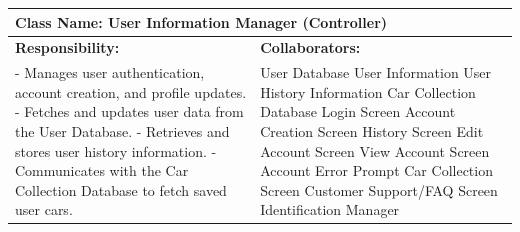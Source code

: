 \documentclass[]{article}
\begin{document}
\begin{table}[ht]
    \centering
    \begin{tabular}{|p{7cm}|p{7cm}|}
    \hline
     \multicolumn{2}{|l|}{\textbf{Class Name: User Information Manager (Controller)}} \\
    \hline
    \textbf{Responsibility:} & \textbf{Collaborators:} \\
    \hline
    - Manages user authentication, account creation, and profile updates. \newline
    - Fetches and updates user data from the User Database. \newline
    - Retrieves and stores user history information. \newline
    - Communicates with the Car Collection Database to fetch saved user cars.
    &
    User Database \newline
    User Information \newline
    User History Information \newline
    Car Collection Database \newline
    Login Screen \newline
    Account Creation Screen \newline
    History Screen \newline
    Edit Account Screen \newline
    View Account Screen \newline
    Account Error Prompt \newline
    Car Collection Screen \newline
    Customer Support/FAQ Screen \newline
    Identification Manager \\
    \hline
    \end{tabular}
\end{table}
\end{document}
